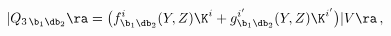 \begin{equation}\label{ansatz1}
|Q_{3\,\b_1\db_2}\ra =
\bigl(f^i_{\b_1\db_2}(Y,Z)\K^i+g^{i'}_{\b_1\db_2}(Y,Z)\K^{i'}\bigr)|V\ra\,,
\end{equation}

